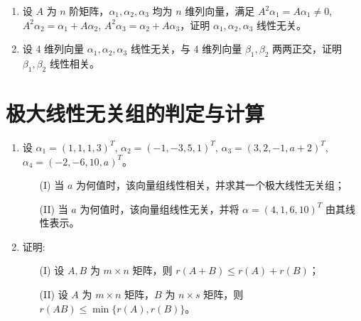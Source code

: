 \documentclass[12pt, a4paper, oneside, UTF8]{ctexbook}
\begin{document}
\begin{enumerate}[label=\arabic*.,start=4]
    \item 设 $A$ 为 $n$ 阶矩阵，$\alpha_1, \alpha_2, \alpha_3$ 均为 $n$ 维列向量，满足 $A^2\alpha_1 = A\alpha_1 \neq 0$, $A^2\alpha_2 = \alpha_1 + A\alpha_2$,
    $A^2\alpha_3 = \alpha_2 + A\alpha_3$，证明 $\alpha_1, \alpha_2, \alpha_3$ 线性无关。
    
    \begin{solution}
    \newpage
    \end{solution}
    
    \item 设 4 维列向量 $\alpha_1, \alpha_2, \alpha_3$ 线性无关，与 4 维列向量 $\beta_1, \beta_2$ 两两正交，证明 $\beta_1, \beta_2$ 线性相关。
    
    \begin{solution}
    \newpage
    \end{solution}
\end{enumerate}

\section{极大线性无关组的判定与计算}

\begin{enumerate}[label=\arabic*.,start=7]
    \item 设 $\alpha_1 = (1,1,1,3)^T$, $\alpha_2 = (-1,-3,5,1)^T$, $\alpha_3 = (3,2,-1, a+2)^T$, $\alpha_4 = (-2,-6,10, a)^T$。
    \begin{enumerate}
        \item [(I)] 当 $a$ 为何值时，该向量组线性相关，并求其一个极大线性无关组；
        \item [(II)] 当 $a$ 为何值时，该向量组线性无关，并将 $\alpha = (4,1,6,10)^T$ 由其线性表示。
    \end{enumerate}
    
    \begin{solution}
    \newpage
    \end{solution}
    
    \item 证明:
    \begin{enumerate}
        \item [(I)] 设 $A, B$ 为 $m \times n$ 矩阵，则 $r(A+B) \leq r(A) + r(B)$；
        \item [(II)] 设 $A$ 为 $m \times n$ 矩阵，$B$ 为 $n \times s$ 矩阵，则 $r(AB) \leq \min\{r(A), r(B)\}$。
    \end{enumerate}
    
    \begin{solution}
    \newpage
    \end{solution}
\end{enumerate}
\end{document}
